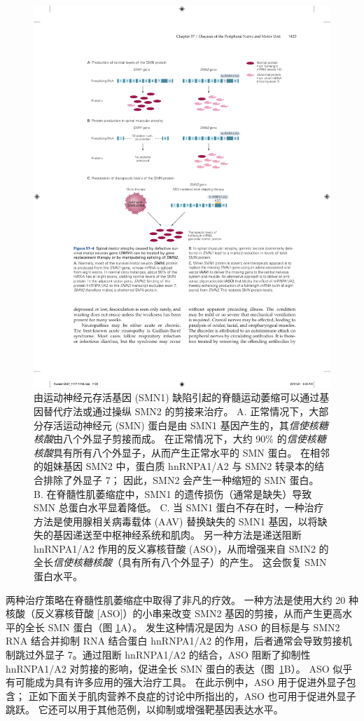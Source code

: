 \begin{figure}[htbp]
	\centering
	\includegraphics[width=0.8\linewidth]{chap57/fig_57_4}
	\caption{由运动神经元存活基因 (SMN1) 缺陷引起的脊髓运动萎缩可以通过基因替代疗法或通过操纵 SMN2 的剪接来治疗。 A. 正常情况下，大部分存活运动神经元 (SMN) 蛋白是由 SMN1 基因产生的，其\textit{信使核糖核酸}由八个外显子剪接而成。 在正常情况下，大约 90\% 的\textit{信使核糖核酸}具有所有八个外显子，从而产生正常水平的 SMN 蛋白。 在相邻的姐妹基因 SMN2 中，蛋白质 hnRNPA1/A2 与 SMN2 转录本的结合排除了外显子 7； 因此，SMN2 会产生一种缩短的 SMN 蛋白。 B. 在脊髓性肌萎缩症中，SMN1 的遗传损伤（通常是缺失）导致 SMN 总蛋白水平显着降低。 C. 当 SMN1 蛋白不存在时，一种治疗方法是使用腺相关病毒载体 (AAV) 替换缺失的 SMN1 基因，以将缺失的基因递送至中枢神经系统和肌肉。 另一种方法是递送阻断 hnRNPA1/A2 作用的反义寡核苷酸 (ASO)，从而增强来自 SMN2 的全长\textit{信使核糖核酸}（具有所有八个外显子）的产生。 这会恢复 SMN 蛋白水平。}
	\label{fig:57_4}
\end{figure}


两种治疗策略在脊髓性肌萎缩症中取得了非凡的疗效。 一种方法是使用大约 20 种核酸（反义寡核苷酸 [ASO]）的小串来改变 SMN2 基因的剪接，从而产生更高水平的全长 SMN 蛋白（图 \ref{fig:57_4}A）。 发生这种情况是因为 ASO 的目标是与 SMN2 RNA 结合并抑制 RNA 结合蛋白 hnRNPA1/A2 的作用，后者通常会导致剪接机制跳过外显子 7。通过阻断 hnRNPA1/A2 的结合，ASO 阻断了抑制性 hnRNPA1/A2 对剪接的影响，促进全长 SMN 蛋白的表达（图~\ref{fig:57_4}B）。
ASO 似乎有可能成为具有许多应用的强大治疗工具。
在此示例中，ASO 用于促进外显子包含；
正如下面关于肌肉营养不良症的讨论中所指出的，ASO 也可用于促进外显子跳跃。
它还可以用于其他范例，以抑制或增强靶基因表达水平。


